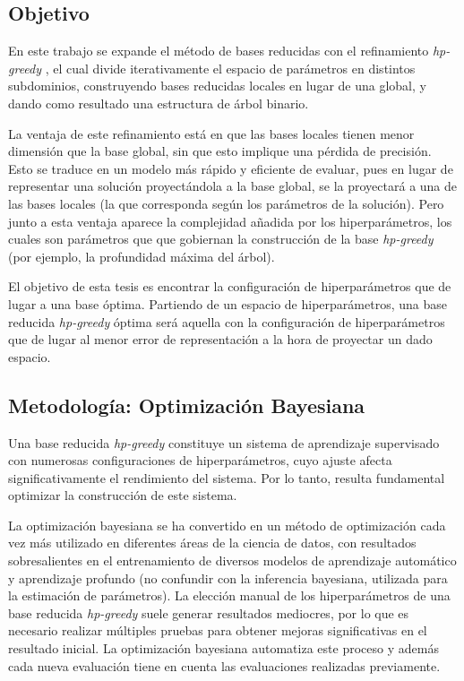 \subsection*{Objetivo}

En este trabajo se expande el método de bases reducidas con el refinamiento \textit{hp-greedy} \cite{Cerino:2022dhr}, el cual divide iterativamente el espacio de parámetros en distintos subdominios, construyendo bases reducidas locales en lugar de una global, y dando como resultado una estructura de árbol binario.

La ventaja de este refinamiento está en que las bases locales tienen menor dimensión que la base global, sin que esto implique una pérdida de precisión. Esto se traduce en un modelo más rápido y eficiente de evaluar, pues en lugar de representar una solución proyectándola a la base global, se la proyectará a una de las bases locales (la que corresponda según los parámetros de la solución). 
Pero junto a esta ventaja aparece la complejidad añadida por los hiperparámetros, los cuales son parámetros que que gobiernan la construcción de la base \textit{hp-greedy} (por ejemplo, la profundidad máxima del árbol).


El objetivo de esta tesis es encontrar la configuración de hiperparámetros que de lugar a una base óptima. Partiendo de un espacio de hiperparámetros, una base reducida \textit{hp-greedy} óptima será aquella con la configuración de hiperparámetros que de lugar al menor error de representación a la hora de proyectar un dado espacio. 


\subsection*{Metodología: Optimización Bayesiana}

Una base reducida \textit{hp-greedy} constituye un sistema de aprendizaje supervisado con numerosas configuraciones de hiperparámetros, cuyo ajuste afecta significativamente el rendimiento del sistema. Por lo tanto, resulta fundamental optimizar la construcción de este sistema.

La optimización bayesiana \cite{7352306, https://doi.org/10.48550/arxiv.1012.2599} se ha convertido en un método de optimización cada vez más utilizado en diferentes áreas de la ciencia de datos, con resultados sobresalientes en el entrenamiento de diversos modelos de aprendizaje automático y aprendizaje profundo (no confundir con la inferencia bayesiana, utilizada para la estimación de parámetros). La elección manual de los hiperparámetros de una base reducida \textit{hp-greedy} suele generar resultados mediocres, por lo que es necesario realizar múltiples pruebas para obtener mejoras significativas en el resultado inicial. La optimización bayesiana automatiza este proceso y además cada nueva evaluación tiene en cuenta las evaluaciones realizadas previamente. 

